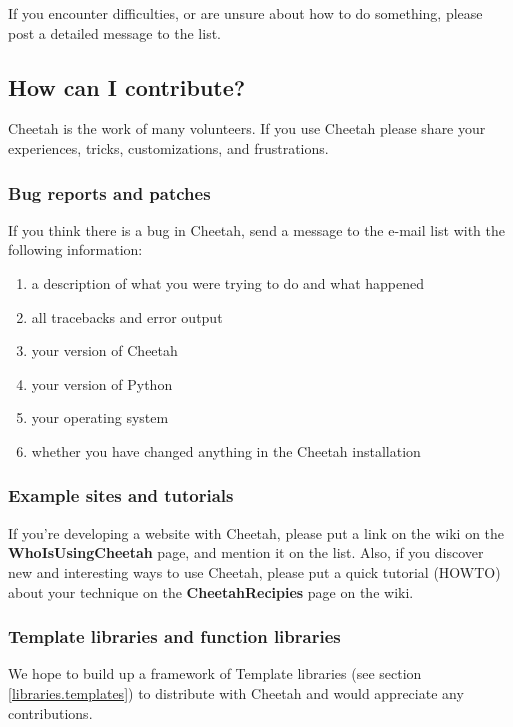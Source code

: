 If you encounter difficulties, or are unsure about how to do something,
please post a detailed message to the list.  

\subsection{How can I contribute?}
\label{intro.contribute}

Cheetah is the work of many volunteers.  If you use Cheetah please share your
experiences, tricks, customizations, and frustrations.

\subsubsection{Bug reports and patches}

If you think there is a bug in Cheetah, send a message to the e-mail list
with the following information:

\begin{enumerate}
\item a description of what you were trying to do and what happened
\item all tracebacks and error output
\item your version of Cheetah
\item your version of Python
\item your operating system
\item whether you have changed anything in the Cheetah installation
\end{enumerate}

\subsubsection{Example sites and tutorials}
If you're developing a website with Cheetah, please put a link on the wiki on
the {\bf WhoIsUsingCheetah} page, and mention it on the list.  Also, if you
discover new and interesting ways to use Cheetah, please put a quick tutorial
(HOWTO) about your technique on the {\bf CheetahRecipies} page on the wiki.

\subsubsection{Template libraries and function libraries}
We hope to build up a framework of Template libraries (see section
\ref{libraries.templates}) to distribute with Cheetah and would appreciate any
contributions.

